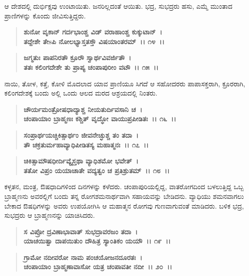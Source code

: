 ಆ ದೇಶದಲ್ಲಿ ದುರ್ಭಿಕ್ಷವು ಉಂಟಾಯಿತು. ಜನರಿಲ್ಲದಂತೆ ಆಯಿತು. ಭದ್ರ, ಸುಭದ್ರರು ಹಸು, ಎಮ್ಮೆ ಮುಂತಾದ ಪ್ರಾಣಿಗಳನ್ನು ಕೊಂದು ಜೀವಿಸುತ್ತಿದ್ದರು.

\begin{verse}
\textbf{ಶುನೋ ವೃಕಾನ್ ಗರ್ದಭಾಂಶ್ಚ ವಿಡ್ ವರಾಹಾಂಶ್ಚ ಕುಕ್ಕುಟಾನ್~।}\\\textbf{ತದ್ದೇಶೇ ತೇsಪಿ ನೋಲಭ್ಯಾಸ್ತತಸ್ತೌ ವಿಷಯಾಂತರಮ್~।। ೧೪~।। }
\end{verse}

\begin{verse}
\textbf{ಜಗ್ಮತುಃ ಪಾಪನಿರತೌ ಕ್ರೂರೌ ಸ್ವಾರ್ಥವಿವರ್ಜಿತೌ~।}\\\textbf{ತತಃ ಕಲಿಂಗದೇಶೇ ತು ಪ್ರಾಪ್ಯ ಚಂಪಾಪುರೀಂ ವಟೌ~।। ೧೫~।।}
\end{verse}

ನಾಯಿ, ತೋಳ, ಕತ್ತೆ, ಕೋಳಿ ಮೊದಲಾದ ಯಾವ ಪ್ರಾಣಿಯೂ ಸಿಗದೆ ಆ ಸಹೋದರರು ಪಾಪಾಸಕ್ತರಾಗಿ, ಕ್ರೂರರಾಗಿ, ಕಲಿಂಗದೇಶಕ್ಕೆ ಬಂದು ಅಲ್ಲಿ ಒಂದು ಆಲದ ಮರದ ಆಶ್ರಯದಲ್ಲಿ ನಿಂತರು.

\begin{verse}
\textbf{ಚೌರ್ಯಮಂತ್ರೋಷಧಾದ್ಯಾಶ್ಚ ನೀಯತುರ್ದಿವಸಾನಿ ಚ~।}\\\textbf{ಚಂಪಾಯಾಂ ಬ್ರಾಹ್ಮಣಃ ಕಶ್ಚಿತ್ ವೃದ್ಧೋ ವಾಯುಪ್ರಪೀಡಿತಃ~।। ೧೬~।।}
\end{verse}

\begin{verse}
\textbf{ಸಂಪ್ರಾರ್ಥಯಚ್ಚಿಕಿತ್ಸಾರ್ಥಂ ಜೀವನೇಚ್ಛುಶ್ಚ ತಂ ತದಾ~।}\\\textbf{ತೌ ಚಕ್ರತುರ್ಮಹಾವ್ಯಾಧಿಪೀಡಿತಸ್ಯ ಮಹಾತ್ಮನಃ~।। ೧೭~।।}
\end{verse}

\begin{verse}
\textbf{ಚಿಕಿತ್ಸಾಮೌಷಧೀರ್ದಿವ್ಯೈಸ್ತಥಾ ವ್ಯಾಧಿಶಮೋ ಭವೇತ್~।}\\\textbf{ತತೋ ವಿಪ್ರಂ ಯಯಾಚಾತೇ ವದ್ಯತ್ವಂ ಚ ಪ್ರತಿಶ್ರುತಮ್~।। ೧೮~।।}
\end{verse}

ಕಳ್ಳತನ, ಮಂತ್ರ, ಔಷಧಾದಿಗಳಿಂದ ದಿನಗಳನ್ನು ಕಳೆದರು. ಚಂಪಾಪುರಿಯಲ್ಲಿದ್ದ, ವಾತರೋಗದಿಂದ ಬಳಲುತ್ತಿದ್ದ ಒಬ್ಬ ಬ್ರಾಹ್ಮಣನು ಅವರಲ್ಲಿಗೆ ಬಂದು ತನ್ನ ರೋಗಶಮನಾರ್ಥವಾಗಿ ಸಹಾಯವನ್ನು ಬೇಡಿದನು. ವ್ಯಾಧಿಯು ಶಮನವಾಗಲು ಬೇಕಾದ ಔಷಧಿಗಳನ್ನು ಅವರು ಉಪಯೋಗಿಸಿ ಆ ಮಹಾತ್ಮನ ರೋಗವು ಗುಣವಾಗುವಂತೆ ಮಾಡಿದರು. ಬಳಿಕ ಭದ್ರ, ಸುಭದ್ರರು ಆ ಬ್ರಾಹ್ಮಣನನ್ನು ಯಾಚಿಸಿದರು.

\begin{verse}
\textbf{ಸ ವಿಪ್ರೋ ದ್ರವಿಣಾಭಾವಾತ್ ಸುಭದ್ರಾವರಜಂ ತದಾ~।}\\\textbf{ಯಾಚಯಿತ್ವಾ ದಾಪಯಿತುಂ ದೌಹಿತ್ರ ಸ್ಯಾಂತಿಕಂ ಯಯೌ~।। ೧೯~।। }
\end{verse}

\begin{verse}
\textbf{ಗ್ರಾಮೋ ನದೀವರೋ ನಾಮ ಪಂಚಯೋಜನದೂರತಃ~।}\\\textbf{ಚಂಪಾಯಾಂ ಬ್ರಾಹ್ಮಣಾವಾಸೋ ಯತ್ರ ಚಂಪಾವತೀ ನದೀ~।। ೨೦~।।}
\end{verse}

